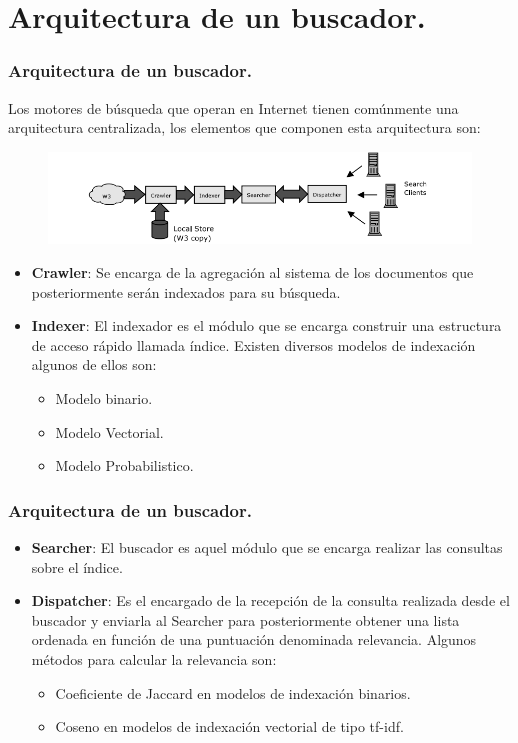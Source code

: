 \documentclass[9pt]{beamer} %
\begin{document}
\section{Arquitectura de un buscador.}
\begin{frame}
	\frametitle{Arquitectura de un buscador.}
Los motores de búsqueda que operan en Internet tienen comúnmente una arquitectura centralizada, los elementos que componen esta arquitectura son:
		\begin{figure}[H]
			\centering
			\includegraphics[scale=0.6]{./img/modeloreferente.png}
		\end{figure}
		\begin{itemize}
			\item \textbf{Crawler}: Se encarga de la agregación al sistema de los documentos que posteriormente serán indexados para su búsqueda.
			\item \textbf{Indexer}: El indexador es el módulo que se encarga construir una estructura de acceso rápido llamada índice.
			Existen diversos modelos de indexación algunos de ellos son:
			\begin{itemize}
				\item Modelo binario.
				\item Modelo Vectorial.
				\item Modelo Probabilistico.
			\end{itemize}
		
		\end{itemize}
\end{frame}

\begin{frame}
	\frametitle{Arquitectura de un buscador.}

	\begin{itemize}
		\item \textbf{Searcher}: El buscador es aquel módulo que se encarga realizar las consultas sobre el índice.
		\item \textbf{Dispatcher}: Es el encargado de la recepción de la consulta realizada desde el buscador y enviarla al Searcher para posteriormente obtener una lista ordenada en función de una puntuación denominada relevancia. Algunos métodos para calcular la relevancia son:
		\begin{itemize}
			\item Coeficiente de Jaccard en modelos de indexación binarios.
			\item Coseno en modelos de indexación vectorial de tipo tf-idf.
		\end{itemize}
		
	
	\end{itemize}
\end{frame}
\end{document}

